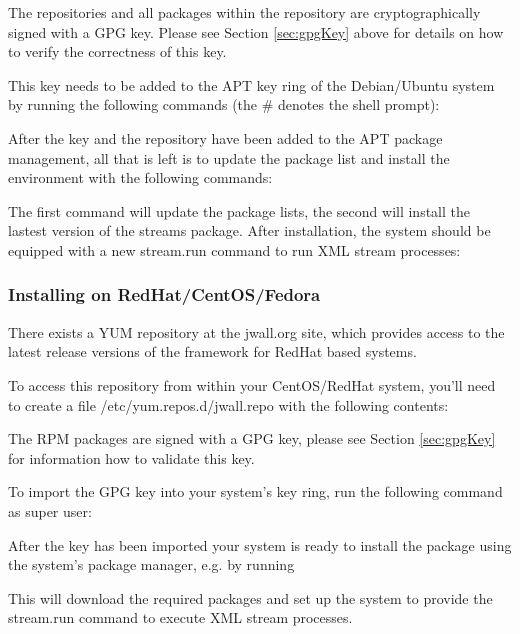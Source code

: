 
The repositories and all packages within the repository are
cryptographically signed with a GPG key. Please see Section
\ref{sec:gpgKey} above for details on how to verify the correctness of
this key.

This key needs to be added to the APT key ring of the Debian/Ubuntu
system by running the following commands (the {\ttfamily \#} denotes
the shell prompt):


After the key and the repository have been added to the APT package
management, all that is left is to update the package list and install
the \streams environment with the following commands:


The first command will update the package lists, the second will install
the lastest version of the {\ttfamily streams} package. After installation,
the system should be equipped with a new {\ttfamily stream.run} command
to run XML stream processes:


\subsubsection{\label{sec:installRPM}Installing on RedHat/CentOS/Fedora}
There exists a YUM repository at the {\ttfamily jwall.org} site, which
provides access to the latest release versions of the \streams framework
for RedHat based systems.

To access this repository from within your CentOS/RedHat system,
you'll need to create a file {\ttfamily /etc/yum.repos.d/jwall.repo}
with the following contents:


The RPM packages are signed with a GPG key, please see Section
\ref{sec:gpgKey} for information how to validate this key.

To import the GPG key into your system's key ring, run the
following command as super user:


After the key has been imported your system is ready to install
the \streams package using the system's package manager, e.g.
by running


This will download the required packages and set up the system
to provide the {\ttfamily stream.run} command to execute XML
stream processes.